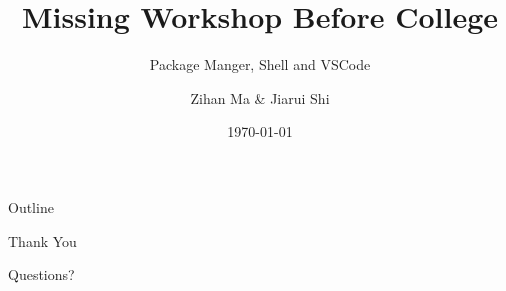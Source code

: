\documentclass[10pt, colorlinks]{beamer}
\title{Missing Workshop Before College}
\subtitle{Package Manger, Shell and VSCode}
\author{Zihan Ma \& Jiarui Shi}
\date{\today}
\institute{Tech GC}
\begin{document}
\frame{\titlepage}

\begin{frame}{Outline}
 \tableofcontents
\end{frame}





% 



\begin{frame}{Thank You}
  \begin{center}
    {\Huge Questions?}
  \end{center}
\end{frame}
\end{document}
